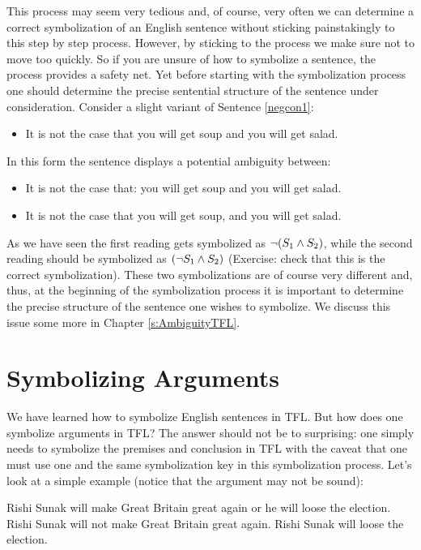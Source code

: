 This process may seem very tedious and, of course, very often we can determine a correct symbolization of an English sentence without sticking painstakingly to this step by step process. However, by sticking to the process we make sure not to move too quickly. So if you are unsure of how to symbolize a sentence, the process provides a safety net. Yet before starting with the symbolization process one should determine the precise sentential structure of the sentence under consideration. Consider a slight variant of Sentence \ref{negcon1}:
\begin{itemize}
	\item It is not the case that you will get soup and you will get salad.
\end{itemize}
In this form the sentence displays a potential ambiguity between:
\begin{itemize}
	\item It is not the case that: you will get soup and you will get salad.
	\item It is not the case that you will get soup, and you will get salad.
\end{itemize}
As we have seen the first reading gets symbolized as $\neg(S_1\mathbin{\wedge} S_2)$, while the second reading should be symbolized as $(\neg S_1\mathbin{\wedge} S_2)$ (Exercise: check that this is the correct symbolization). These two symbolizations are of course very different and, thus, at the beginning of the symbolization process it is important to determine the precise structure of the sentence one wishes to symbolize. We discuss this issue some more in Chapter \ref{s:AmbiguityTFL}.

\section{Symbolizing Arguments}
We have learned how to symbolize English sentences in TFL. But how does one symbolize arguments in TFL? The answer should not be to surprising: one simply needs to symbolize the premises and conclusion in TFL with the caveat that one must use one and the same symbolization key in this symbolization process. Let's look at a simple example (notice that the argument may not be sound):

\begin{earg}
	\prem Rishi Sunak will make Great Britain great again or he will loose the election.
	\prem Rishi Sunak will not make Great Britain great again.
	\conc Rishi Sunak will loose the election.
\end{earg}

